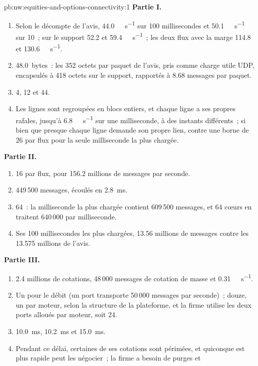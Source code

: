 \begin{solution}{pb:nw:equities-and-options-connectivity:1}
\textbf{Partie I.}
\begin{enumerate}
\item Selon le décompte de l'avis, \qty{44.0}{\giga\bit\per\second} sur 100 millisecondes et \qty{50.1}{\giga\bit\per\second} sur 10~; sur le
  support 52.2 et \qty{59.4}{\giga\bit\per\second}~; les deux flux avec la marge 114.8 et \qty{130.6}{\giga\bit\per\second}.
\item \qty{48.0}{bytes}~: les 352 octets par paquet de l'avis, pris comme charge utile UDP, encapsulés à 418 octets sur le support, rapportés à 8.68 messages par paquet.
\item 4, 12 et 44.
\item Les lignes sont regroupées en blocs entiers, et chaque ligne a ses propres rafales, jusqu'à \qty{6.8}{\giga\bit\per\second} sur une milliseconde, à des
  instants différents~; si bien que presque chaque ligne demande son propre lien, contre une borne de 26 par flux pour la seule milliseconde la plus chargée.
\end{enumerate}
\textbf{Partie II.}
\begin{enumerate}[resume]
\item 16 par flux, pour 156.2 millions de messages par seconde.
\item 449\,500 messages, écoulés en \qty{2.8}{\milli\second}.
\item 64~: la milliseconde la plus chargée contient 609\,500 messages, et 64 cœurs en traitent 640\,000 par milliseconde.
\item Ses 100 millisecondes les plus chargées, 13.56 millions de messages contre les 13.575 millions de l'avis.
\end{enumerate}
\textbf{Partie III.}
\begin{enumerate}[resume]
\item 2.4 millions de cotations, 48\,000 messages de cotation de masse et \qty{0.31}{\giga\bit\per\second}.
\item Un pour le débit (un port transporte 50\,000 messages par seconde)~; douze, un par moteur, selon la structure de la plateforme, et la firme
  utilise les deux ports alloués par moteur, soit 24.
\item \qty{10.0}{\milli\second}, \qty{10.2}{\milli\second} et \qty{15.0}{\milli\second}.
\item Pendant ce délai, certaines de ses cotations sont périmées, et quiconque est plus rapide peut les négocier~; la firme a besoin de purges et

\end{enumerate}
\end{solution}
